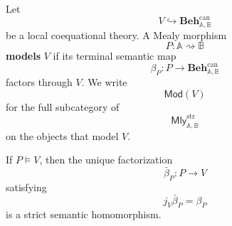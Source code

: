 \begin{definition}[Models]
\label{def:models-coequational-theory}
    Let
    \[
        V\hookrightarrow\mathbf{Beh}^{\mathrm{can}}_{\mathbb A,\mathbb B}
    \]
    be a local coequational theory. A Mealy morphism
    \[
        P:\mathbb A\rightsquigarrow\mathbb B
    \]
    \textbf{models} \(V\) if its terminal semantic map
    \[
        \beta_P:P\to\mathbf{Beh}^{\mathrm{can}}_{\mathbb A,\mathbb B}
    \]
    factors through \(V\). We write
    \[
        \mathsf{Mod}(V)
    \]
    for the full subcategory of
    \[
        \mathsf{Mly}^{\mathrm{str}}_{\mathbb A,\mathbb B}
    \]
    on the objects that model \(V\).
\end{definition}

\begin{lemma}
\label{lem:model-factorizations-strict}
    If \(P\models V\), then the unique factorization
    \[
        \bar\beta_P:P\to V
    \]
    satisfying
    \[
        j_V\bar\beta_P=\beta_P
    \]
    is a strict semantic homomorphism.
\end{lemma}

